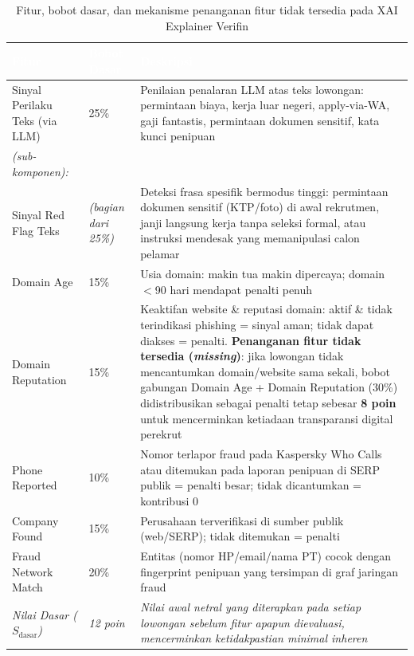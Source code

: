 \documentclass[12pt,a4paper]{article}
\newcommand{\thead}[1]{\textcolor{white}{\textbf{#1}}}
\begin{document}
\begin{adjustwidth}{1.45cm}{0pt}
\begin{table}[H]
\centering
\caption{Fitur, bobot dasar, dan mekanisme penanganan fitur tidak tersedia pada XAI Explainer Verifin}
\label{tab:xai-weights}
\small
\begin{tabularx}{\linewidth}{@{}p{3.6cm}p{1.8cm}Y@{}}
\toprule
{}\thead{Fitur} & \thead{Bobot Dasar} & \thead{Deskripsi} \\
\midrule
Sinyal Perilaku Teks (via LLM) & 25\% & Penilaian penalaran LLM atas teks lowongan: permintaan biaya, kerja luar negeri, apply-via-WA, gaji fantastis, permintaan dokumen sensitif, kata kunci penipuan \\
\quad\textit{(sub-komponen):} & & \\
\quad Sinyal Red Flag Teks & \textit{(bagian dari 25\%)} & Deteksi frasa spesifik bermodus tinggi: permintaan dokumen sensitif (KTP/foto) di awal rekrutmen, janji langsung kerja tanpa seleksi formal, atau instruksi mendesak yang memanipulasi calon pelamar \\
Domain Age & 15\% & Usia domain: makin tua makin dipercaya; domain $<$90 hari mendapat penalti penuh \\
Domain Reputation & 15\% & Keaktifan website \& reputasi domain: aktif \& tidak terindikasi phishing = sinyal aman; tidak dapat diakses = penalti. \textbf{Penanganan fitur tidak tersedia (\textit{missing})}: jika lowongan tidak mencantumkan domain/website sama sekali, bobot gabungan Domain Age + Domain Reputation (30\%) didistribusikan sebagai penalti tetap sebesar \textbf{8 poin} untuk mencerminkan ketiadaan transparansi digital perekrut \\
Phone Reported & 10\% & Nomor terlapor fraud pada Kaspersky Who Calls atau ditemukan pada laporan penipuan di SERP publik = penalti besar; tidak dicantumkan = kontribusi 0 \\
Company Found & 15\% & Perusahaan terverifikasi di sumber publik (web/SERP); tidak ditemukan = penalti \\
Fraud Network Match & 20\% & Entitas (nomor HP/email/nama PT) cocok dengan fingerprint penipuan yang tersimpan di graf jaringan fraud \\
\midrule
\textit{Nilai Dasar ($S_{\text{dasar}}$)} & \textit{12 poin} & \textit{Nilai awal netral yang diterapkan pada setiap lowongan sebelum fitur apapun dievaluasi, mencerminkan ketidakpastian minimal inheren} \\
\bottomrule
\end{tabularx}
\end{table}
\end{adjustwidth}
\end{document}
